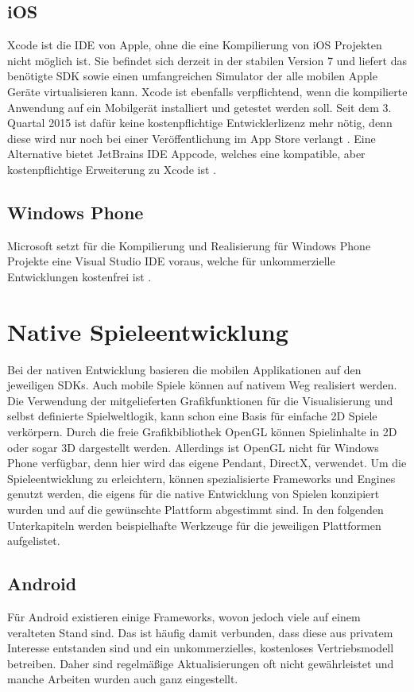 \subsection{iOS}
Xcode ist die IDE von Apple, ohne die eine Kompilierung von iOS Projekten nicht möglich ist.
Sie befindet sich derzeit in der stabilen Version 7 und liefert das benötigte SDK sowie einen umfangreichen Simulator der alle mobilen Apple Geräte virtualisieren kann. Xcode ist ebenfalls verpflichtend, wenn die kompilierte Anwendung auf ein Mobilgerät installiert und getestet werden soll. Seit dem 3. Quartal 2015 ist dafür keine kostenpflichtige Entwicklerlizenz mehr nötig, denn diese wird nur noch bei einer Veröffentlichung im App Store verlangt \citep{t3n_xcode7}.
Eine Alternative bietet JetBrains IDE Appcode, welches eine kompatible, aber kostenpflichtige Erweiterung zu Xcode ist \citep{appcode}.

\subsection{Windows Phone}
Microsoft setzt für die Kompilierung und Realisierung für Windows Phone Projekte eine Visual Studio IDE voraus, welche für unkommerzielle Entwicklungen kostenfrei ist \citep{visual_studio}.

\pagebreak

\section{Native Spieleentwicklung}
Bei der nativen Entwicklung basieren die mobilen Applikationen auf den jeweiligen SDKs. Auch mobile Spiele können auf nativem Weg realisiert werden. Die Verwendung der mitgelieferten Grafikfunktionen für die Visualisierung und selbst definierte Spielweltlogik, kann schon eine Basis für einfache 2D Spiele verkörpern. Durch die freie Grafikbibliothek OpenGL können Spielinhalte in 2D oder sogar 3D dargestellt werden. Allerdings ist OpenGL nicht für Windows Phone verfügbar, denn hier wird das eigene Pendant, DirectX, verwendet. Um die Spieleentwicklung zu erleichtern, können spezialisierte Frameworks und Engines genutzt werden, die eigens für die native Entwicklung von Spielen konzipiert wurden und auf die gewünschte Plattform abgestimmt sind. In den folgenden Unterkapiteln werden beispielhafte Werkzeuge für die jeweiligen Plattformen aufgelistet.
 

\subsection{Android}
Für Android existieren einige Frameworks, wovon jedoch viele auf einem veralteten Stand sind. Das ist häufig damit verbunden, dass diese aus privatem Interesse entstanden sind und ein unkommerzielles, kostenloses Vertriebsmodell betreiben. Daher sind regelmäßige Aktualisierungen oft nicht gewährleistet und manche Arbeiten wurden auch ganz eingestellt.

